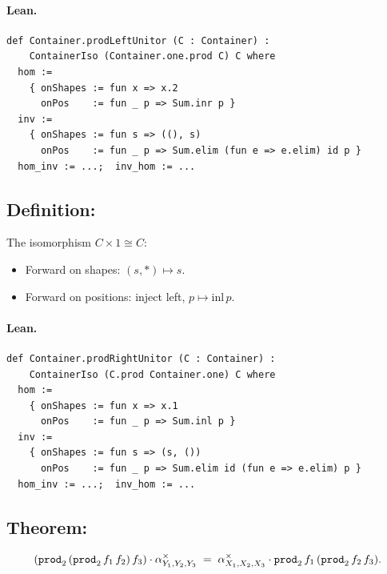 \documentclass[11pt,a4paper]{article}
\begin{document}
\paragraph{Lean.}
\begin{lstlisting}[style=lean]
def Container.prodLeftUnitor (C : Container) :
    ContainerIso (Container.one.prod C) C where
  hom :=
    { onShapes := fun x => x.2
      onPos    := fun _ p => Sum.inr p }
  inv :=
    { onShapes := fun s => ((), s)
      onPos    := fun _ p => Sum.elim (fun e => e.elim) id p }
  hom_inv := ...;  inv_hom := ...
\end{lstlisting}


\subsection{Definition: }

\begin{defn}
The isomorphism $C \times 1 \cong C$:
\begin{itemize}
  \item Forward on shapes: $(s, \ast) \mapsto s$.
  \item Forward on positions: inject left, $p \mapsto \mathrm{inl}\,p$.
\end{itemize}
\end{defn}

\paragraph{Lean.}
\begin{lstlisting}[style=lean]
def Container.prodRightUnitor (C : Container) :
    ContainerIso (C.prod Container.one) C where
  hom :=
    { onShapes := fun x => x.1
      onPos    := fun _ p => Sum.inl p }
  inv :=
    { onShapes := fun s => (s, ())
      onPos    := fun _ p => Sum.elim id (fun e => e.elim) p }
  hom_inv := ...;  inv_hom := ...
\end{lstlisting}


\subsection{Theorem: }

\begin{thm}
\[
  (\texttt{prod}_2\,(\texttt{prod}_2\,f_1\,f_2)\,f_3) \cdot \alpha^\times_{Y_1,Y_2,Y_3}
  \;=\;
  \alpha^\times_{X_1,X_2,X_3} \cdot \texttt{prod}_2\,f_1\,(\texttt{prod}_2\,f_2\,f_3).
\]
\end{thm}
\end{document}
